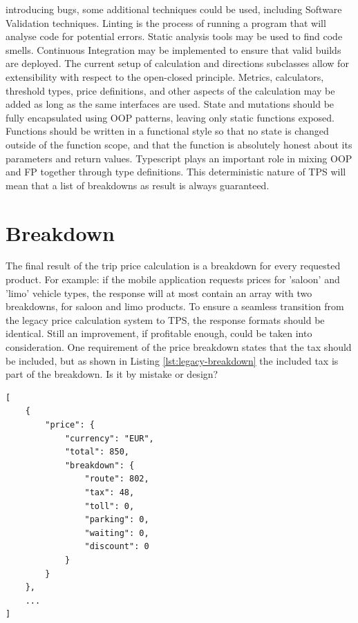 introducing bugs, some additional techniques could be used, including Software Validation techniques. Linting is the process of running a program that will analyse code for potential errors. Static analysis tools may be used to find code smells. Continuous Integration may be implemented to ensure that valid builds are deployed. The current setup of calculation and directions subclasses allow for extensibility with respect to the open-closed principle. Metrics, calculators, threshold types, price definitions, and other aspects of the calculation may be added as long as the same interfaces are used. State and mutations should be fully encapsulated using OOP patterns, leaving only static functions exposed. Functions should be written in a functional style so that no state is changed outside of the function scope, and that the function is absolutely honest about its parameters and return values. Typescript plays an important role in mixing OOP and FP together through type definitions. This deterministic nature of TPS will mean that a list of breakdowns as result is always guaranteed.

\section{Breakdown}
The final result of the trip price calculation is a breakdown for every requested product. For example: if the mobile application requests prices for 'saloon' and 'limo' vehicle types, the response will at most contain an array with two breakdowns, for saloon and limo products. To ensure a seamless transition from the legacy price calculation system to TPS, the response formats should be identical. Still an improvement, if profitable enough, could be taken into consideration. One requirement of the price breakdown states that the tax should be included, but as shown in Listing \ref{lst:legacy-breakdown} the included tax is part of the breakdown. Is it by mistake or design?

\begin{center}
\noindent\begin{minipage}{.85\textwidth}
\begin{lstlisting}[caption={Legacy price breakdown}, label={lst:legacy-breakdown}]
[
	{
		"price": {
			"currency": "EUR",
			"total": 850,
			"breakdown": {
				"route": 802,
				"tax": 48,
				"toll": 0,
				"parking": 0,
				"waiting": 0,
				"discount": 0
			}
		}
	},
	...
]
\end{lstlisting}
\end{minipage}
\end{center}

